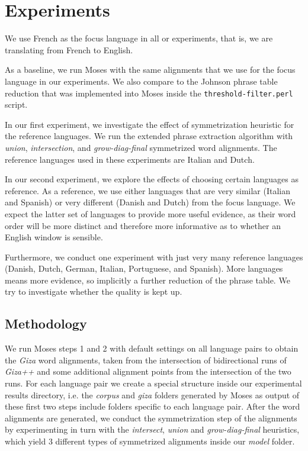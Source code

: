 \documentclass[11pt]{article}
\begin{document}
\section{Experiments}
We use French as the focus language in all or experiments, that is, we are translating from French to English. 

As a baseline, we run Moses with the same alignments that we use for the focus language in our experiments. We also compare to the Johnson phrase table reduction that was implemented into Moses inside the { \tt threshold-filter.perl} script.

In our first experiment, we investigate the effect of symmetrization heuristic for the reference languages. We run the extended phrase extraction algorithm with \textit{union}, \textit{intersection}, and \textit{grow-diag-final} symmetrized word alignments. The reference languages used in these experiments are Italian and Dutch.

 In our second experiment, we explore the effects of choosing certain languages as reference. As a reference, we use either languages that are very similar (Italian and Spanish) or very different (Danish and Dutch) from the focus language. We expect the latter set of languages to provide more useful evidence, as their word order will be more distinct and therefore more informative as to whether an English window is sensible.

Furthermore, we conduct one experiment with just very many reference languages (Danish, Dutch, German, Italian, Portuguese, and Spanish). More languages means more evidence, so implicitly a further reduction of the phrase table. We try to investigate whether the quality is kept up. 


\subsection{Methodology}

We run Moses steps 1 and 2 with default settings on all language pairs to obtain the \textit{Giza} word alignments, taken from the intersection of bidirectional runs of \textit{Giza++} and some additional alignment points from the intersection of the two runs. For each language pair we create a special structure inside our experimental results directory, i.e. the \textit{corpus} and \textit{giza} folders generated by Moses as output of these first two steps include folders specific to each language pair. After the word alignments are generated, we conduct the symmetrization step of the alignments by experimenting in turn with the \textit{intersect}, \textit{union} and \textit{grow-diag-final} heuristics, which yield 3 different types of symmetrized alignments inside our \textit{model} folder. 
\end{document}
